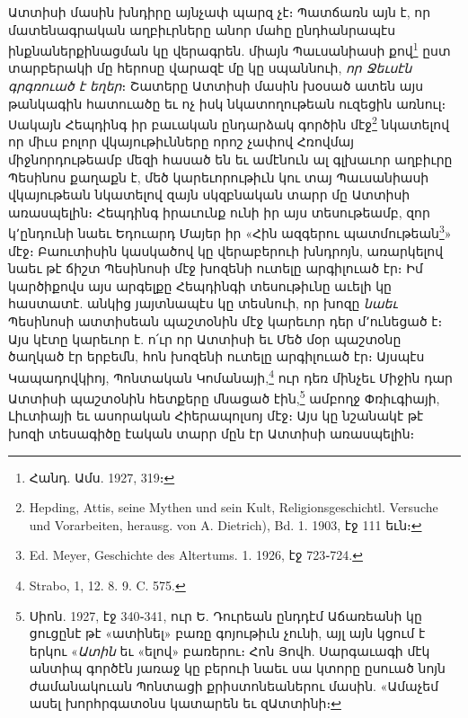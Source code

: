 \documentclass{article}
\begin{document}
{Ատտիսի մասին խնդիրը այնչափ պարզ չէ։ Պատճառն այն է, որ մատենագրական աղբիւրները անոր մահը ընդհանրապէս ինքնաներքինացման կը վերագրեն. միայն Պաւսանիասի քով\footnote{Հանդ. Ամս. 1927, 319։} ըստ տարբերակի մը հերոսը վարազէ մը կը սպաննուի, \emph{որ Ջեւսէն գրգռուած է եղեր}։ Շատերը Ատտիսի մասին խօսած ատեն այս թանկագին հատուածը եւ ոչ իսկ նկատողութեան ուզեցին առնուլ։ Սակայն Հեպդինգ իր բաւական ընդարձակ գործին մէջ\footnote{Hepding, Attis, seine Mythen und sein Kult, Religionsgeschichtl. Versuche und Vorarbeiten, herausg. von A. Dietrich), Bd. 1. 1903, էջ 111 եւն։} նկատելով որ միւս բոլոր վկայութիւնները որոշ չափով Հռովմայ միջնորդութեամբ մեզի հասած են եւ ամէնուն ալ գլխաւոր աղբիւրը Պեսինոս քաղաքն է, մեծ կարեւորութիւն կու տայ Պաւսանիասի վկայութեան նկատելով զայն սկզբնական տարր մը Ատտիսի առասպելին։ Հեպդինգ իրաւունք ունի իր այս տեսութեամբ, զոր կ՚ընդունի նաեւ Եդուարդ Մայեր իր «Հին ազգերու պատմութեան\footnote{Ed. Meyer, Geschichte des Altertums. 1. 1926, էջ 723֊724.}» մէջ։ Բաուտիսին կասկածով կը վերաբերուի խնդրոյն, առարկելով նաեւ թէ ճիշտ Պեսինոսի մէջ խոզենի ուտելը արգիլուած էր։ Իմ կարծիքովս այս արգելքը Հեպդինգի տեսութիւնը աւելի կը հաստատէ. անկից յայտնապէս կը տեսնուի, որ խոզը \emph{նաեւ} Պեսինոսի ատտիսեան պաշտօնին մէջ կարեւոր դեր մ՚ունեցած է։ Այս կէտը կարեւոր է. ո՛ւր որ Ատտիսի եւ Մեծ մօր պաշտօնը ծաղկած էր երբեմն, հոն խոզենի ուտելը արգիլուած էր։ Այսպէս Կապադովկիոյ, Պոնտական Կոմանայի,\footnote{Strabo, 1, 12. 8. 9. C. 575.} ուր դեռ մինչեւ Միջին դար Ատտիսի պաշտօնին հետքերը մնացած էին,\footnote{Սիոն. 1927, էջ 340֊341, ուր Ե. Դուրեան ընդդէմ Աճառեանի կը ցուցընէ թէ «ատինել» բառը գոյութիւն չունի, այլ այն կցում է երկու «\emph{Ատին} եւ «ելով» բառերու։ Հոն Յովհ. Սարգաւագի մէկ անտիպ գործէն յառաջ կը բերուի նաեւ սա կտորը ըսուած նոյն ժամանակուան Պոնտացի քրիստոնեաներու մասին. «Ամաչեմ ասել խորհրգատօնս կատարեն եւ զԱտտինի։} ամբողջ Փռիւգիայի, Լիւտիայի եւ ասորական Հիերապոլսոյ մէջ։ Այս կը նշանակէ թէ խոզի տեսագիծը էական տարր մըն էր Ատտիսի առասպելին։

}
\end{document}
